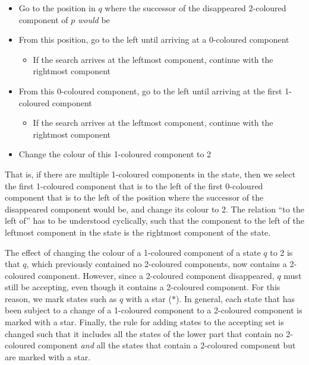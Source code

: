 \begin{itemize}
\item Go to the position in $q$ where the successor of the disappeared 2-coloured component of $p$ \textit{would} be
\item From this position, go to the left until arriving at a 0-coloured component
  \begin{itemize}
  \item If the search arrives at the leftmost component, continue with the rightmost component
  \end{itemize}
\item From this 0-coloured component, go to the left until arriving at the first 1-coloured component
  \begin{itemize}
  \item If the search arrives at the leftmost component, continue with the rightmost component
  \end{itemize}
\item Change the colour of this 1-coloured component to 2
\end{itemize}

That is, if there are multiple 1-coloured components in the state, then we select the first 1-coloured component that is to the left of the first 0-coloured component that is to the left of the position where the successor of the disappeared component would be, and change its colour to 2. The relation ``to the left of'' has to be understood cyclically, such that the component to the left of the leftmost component in the state is the rightmost component of the state.

The effect of changing the colour of a 1-coloured component of a state $q$ to 2 is that $q$, which previously contained no 2-coloured  components, now contains a 2-coloured component. However, since a 2-coloured component disappeared, $q$ must still be accepting, even though it contains a 2-coloured component. For this reason, we mark states such as $q$ with a star ($*$). In general, each state that has been subject to a change of a 1-coloured component to a 2-coloured component is marked with a star. Finally, the rule for adding states to the accepting set is changed such that it includes all the states of the lower part that contain no 2-coloured component \textit{and} all the states that contain a 2-coloured component but are marked with a star.


